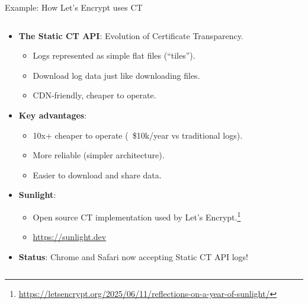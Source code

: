 \documentclass[aspectratio=169, lualatex, handout]{beamer}
\begin{document}
\begin{frame}{Example: How Let's Encrypt uses CT}
	\begin{columns}[c]
		\begin{column}{1\textwidth}
			\begin{itemize}[<+->]
				\item \textbf{The Static CT API}: Evolution of Certificate Transparency.
				      \begin{itemize}
					      \item Logs represented as simple flat files (``tiles'').
					      \item Download log data just like downloading files.
					      \item CDN-friendly, cheaper to operate.
				      \end{itemize}
				\item \textbf{Key advantages}:
				      \begin{itemize}
					      \item 10x+ cheaper to operate (~\$10k/year vs traditional logs).
					      \item More reliable (simpler architecture).
					      \item Easier to download and share data.
				      \end{itemize}
				\item \textbf{Sunlight}:
				      \begin{itemize}
					      \item Open source CT implementation used by Let's Encrypt.\footnote{\url{https://letsencrypt.org/2025/06/11/reflections-on-a-year-of-sunlight/}}
					      \item \url{https://sunlight.dev}
				      \end{itemize}
				\item \textbf{Status}: Chrome and Safari now accepting Static CT API logs!
			\end{itemize}
		\end{column}
	\end{columns}
\end{frame}
\end{document}
